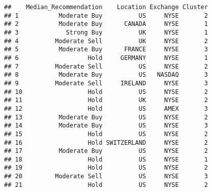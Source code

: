 \documentclass[
]{article}
\newenvironment{Shaded}{\begin{snugshade}}{\end{snugshade}}
\newcommand{\AttributeTok}[1]{\textcolor[rgb]{0.77,0.63,0.00}{#1}}
\newcommand{\DecValTok}[1]{\textcolor[rgb]{0.00,0.00,0.81}{#1}}
\newcommand{\DocumentationTok}[1]{\textcolor[rgb]{0.56,0.35,0.01}{\textbf{\textit{#1}}}}
\newcommand{\FunctionTok}[1]{\textcolor[rgb]{0.00,0.00,0.00}{#1}}
\newcommand{\NormalTok}[1]{#1}
\newcommand{\OtherTok}[1]{\textcolor[rgb]{0.56,0.35,0.01}{#1}}
\newcommand{\SpecialCharTok}[1]{\textcolor[rgb]{0.00,0.00,0.00}{#1}}
\begin{document}
\begin{Shaded}
\end{Shaded}

\begin{verbatim}
##    Median_Recommendation    Location Exchange Cluster
## 1           Moderate Buy          US     NYSE       2
## 2           Moderate Buy      CANADA     NYSE       1
## 3             Strong Buy          UK     NYSE       1
## 4          Moderate Sell          UK     NYSE       2
## 5           Moderate Buy      FRANCE     NYSE       3
## 6                   Hold     GERMANY     NYSE       1
## 7          Moderate Sell          US     NYSE       2
## 8           Moderate Buy          US   NASDAQ       3
## 9          Moderate Sell     IRELAND     NYSE       3
## 10                  Hold          US     NYSE       2
## 11                  Hold          UK     NYSE       2
## 12                  Hold          US     AMEX       3
## 13          Moderate Buy          US     NYSE       2
## 14          Moderate Buy          US     NYSE       3
## 15                  Hold          US     NYSE       2
## 16                  Hold SWITZERLAND     NYSE       2
## 17          Moderate Buy          US     NYSE       2
## 18                  Hold          US     NYSE       1
## 19                  Hold          US     NYSE       2
## 20         Moderate Sell          US     NYSE       3
## 21                  Hold          US     NYSE       2
\end{verbatim}
\end{document}
